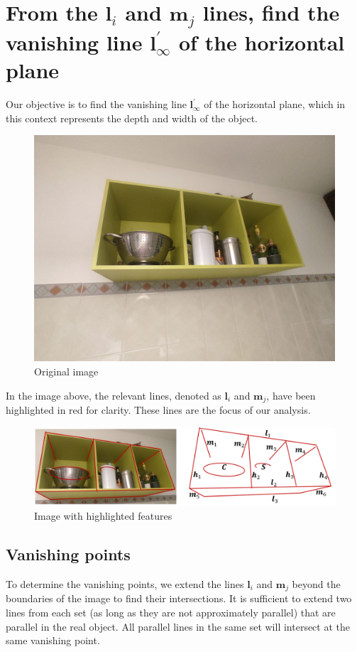\section{From the $\mathbf{l}_i$ and $\mathbf{m}_j$ lines, find the vanishing line $\mathbf{l}^\prime_{\infty}$ of the horizontal plane}

Our objective is to find the vanishing line $\mathbf{l}^\prime_{\infty}$ of the horizontal plane, which in this context represents the depth and width of the object.
\begin{figure}[H]
    \centering
    \includegraphics[width=0.75\linewidth]{images/original.jpg}
    \caption{Original image}
\end{figure}
In the image above, the relevant lines, denoted as $\mathbf{l}_i$ and $\mathbf{m}_j$, have been highlighted in red for clarity. 
These lines are the focus of our analysis.
\begin{figure}[H]
    \centering
    \includegraphics[width=0.75\linewidth]{images/lines.png}
    \caption{Image with highlighted features}
\end{figure}

\subsection{Vanishing points}
To determine the vanishing points, we extend the lines $\mathbf{l}_i$ and $\mathbf{m}_j$ beyond the boundaries of the image to find their intersections.
It is sufficient to extend two lines from each set (as long as they are not approximately parallel) that are parallel in the real object.
All parallel lines in the same set will intersect at the same vanishing point.


